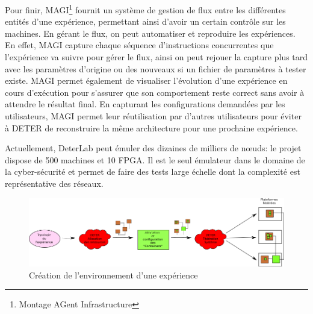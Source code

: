 Pour finir, MAGI\footnote{Montage AGent Infrastructure} fournit un système de
gestion de flux entre les différentes entités d'une expérience, permettant ainsi
d'avoir un certain contrôle sur les machines. En gérant le flux, on peut
automatiser et reproduire les expériences. En effet, MAGI capture chaque
séquence d'instructions concurrentes que l'expérience va suivre pour gérer le
flux, ainsi on peut rejouer la capture plus tard avec les paramètres d'origine
ou des nouveaux si un fichier de paramètres à tester existe. MAGI permet
également de visualiser l'évolution d'une expérience en cours d'exécution pour
s'assurer que son comportement reste correct sans avoir à attendre le résultat
final. En capturant les configurations demandées par les utilisateurs, MAGI
permet leur réutilisation par d'autres utilisateurs pour éviter à DETER de
reconstruire la même architecture pour une prochaine expérience.

Actuellement, DeterLab peut émuler des dizaines de milliers de n\oe uds: le
projet dispose de 500 machines et 10 FPGA. Il est le seul émulateur dans le
domaine de la cyber-sécurité et permet de faire des tests large échelle dont la
complexité est représentative des réseaux.
 
\begin{figure}[H]
\centering
\includegraphics[scale=0.63]{Pictures/png/Deter_fonctionnement_general}
\caption{Création de l'environnement d'une expérience}
\label{Deter_fonc}
\end{figure}
